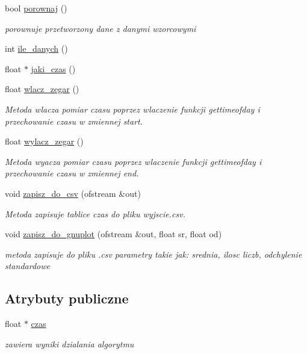 \begin{DoxyCompactItemize}
bool \hyperlink{classalgorytm_a167adca6239e12cb5d362fd7c905dde0}{porownaj} ()
\begin{DoxyCompactList}\small\item\em porownuje przetworzony dane z danymi wzorcowymi \end{DoxyCompactList}\item 
int \hyperlink{classalgorytm_acbd9260a0b2055acee485f737b960992}{ile\-\_\-danych} ()
\item 
float $\ast$ \hyperlink{classalgorytm_adcd99d6f8b10e222f47fd61328b84c67}{jaki\-\_\-czas} ()
\item 
float \hyperlink{classalgorytm_a24d2f97e025292bb4ac297f73fb957d3}{wlacz\-\_\-zegar} ()
\begin{DoxyCompactList}\small\item\em \-Metoda wlacza pomiar czasu poprzez wlaczenie funkcji {\ttfamily gettimeofday} i przechowanie czasu w zmiennej {\ttfamily start}. \end{DoxyCompactList}\item 
float \hyperlink{classalgorytm_a2138e99c4a4c10b366b4dcea37aa7d00}{wylacz\-\_\-zegar} ()
\begin{DoxyCompactList}\small\item\em \-Metoda wyacza pomiar czasu poprzez wlaczenie funkcji {\ttfamily gettimeofday} i przechowanie czasu w zmiennej {\ttfamily end}. \end{DoxyCompactList}\item 
void \hyperlink{classalgorytm_a8354af1fb9c7452012a6defcf98d39d8}{zapisz\-\_\-do\-\_\-csv} (ofstream \&out)
\begin{DoxyCompactList}\small\item\em \-Metoda zapisuje tablice {\ttfamily czas} do pliku {\ttfamily wyjscie.\-csv}. \end{DoxyCompactList}\item 
void \hyperlink{classalgorytm_ad2051f4366b78a7c73adc8b3418a495c}{zapisz\-\_\-do\-\_\-gnuplot} (ofstream \&out, float sr, float od)
\begin{DoxyCompactList}\small\item\em metoda zapisuje do pliku .csv parametry takie jak\-: srednia, ilosc liczb, odchylenie standardowe \end{DoxyCompactList}\end{DoxyCompactItemize}
\subsection*{\-Atrybuty publiczne}
\begin{DoxyCompactItemize}
\item 
float $\ast$ \hyperlink{classalgorytm_a8005d5f3266848b756400e3bb189de58}{czas}
\begin{DoxyCompactList}\small\item\em zawiera wyniki dzialania algorytmu \end{DoxyCompactList}\end{DoxyCompactItemize}
